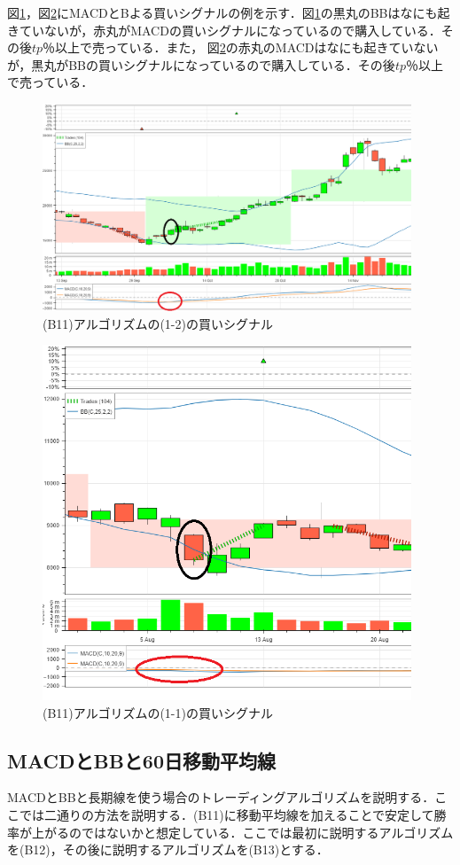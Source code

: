 図\ref{fig:bb0macd}，図\ref{fig:bbmacd0}にMACDとBよる買いシグナルの例を示す．図\ref{fig:bb0macd}の黒丸のBBはなにも起きていないが，赤丸がMACDの買いシグナルになっているので購入している．その後$tp$％以上で売っている．また，
図\ref{fig:bbmacd0}の赤丸のMACDはなにも起きていないが，黒丸がBBの買いシグナルになっているので購入している．その後$tp$％以上で売っている．
  \begin{figure}[H]
    \centering
    \includegraphics[width=110mm]{fig/bb0_or_macd_paint.png}
    \caption{(B11)アルゴリズムの(1-2)の買いシグナル}
    \label{fig:bb0macd}
   \end{figure}

  \begin{figure}[H]
    \centering
    \includegraphics[width=110mm]{fig/bb_or_macd0_paint.png}
    \caption{(B11)アルゴリズムの(1-1)の買いシグナル}
    \label{fig:bbmacd0}
   \end{figure}
\subsection{MACDとBBと60日移動平均線}
MACDとBBと長期線を使う場合のトレーディングアルゴリズムを説明する．ここでは二通りの方法を説明する．(B11)に移動平均線を加えることで安定して勝率が上がるのではないかと想定している．ここでは最初に説明するアルゴリズムを(B12)，その後に説明するアルゴリズムを(B13)とする．


